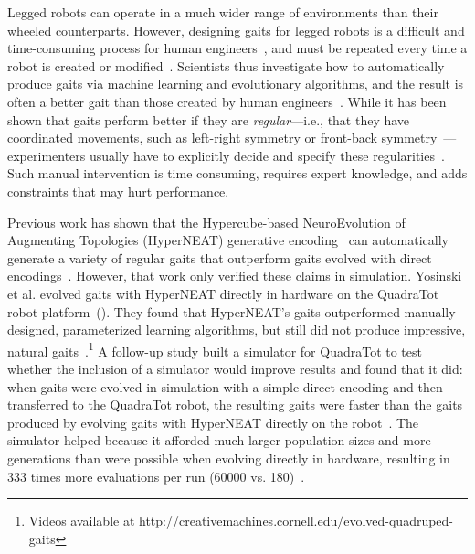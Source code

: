 
Legged robots can operate in a much wider range of environments than their wheeled counterparts. However, designing gaits for legged robots is a difficult and time-consuming process for human engineers~\cite{strom1999legged,wettergreen1992gait}, and must be repeated every time a robot is created or modified~\cite{hornby2005autonomous}. 
Scientists thus investigate how to automatically produce gaits via machine learning and evolutionary algorithms, and the result is often a better gait than those created by human engineers~\cite{valsalam:mii,kohl:stone,hornby2005autonomous,hornby2003generative,yos:clune}. While it has been shown that gaits perform better if they are \emph{regular}---i.e., that they have coordinated movements, such as left-right symmetry or front-back symmetry~\cite{valsalam:mii,clune2011performance,clune2009evolving,clune2009sensitivity}---experimenters usually have to explicitly decide and specify these regularities~\cite{valsalam:mii,tellez,beer,raibert}. 
Such manual intervention is time consuming, requires expert knowledge, and adds constraints that may hurt performance. 

Previous work has shown that the Hypercube-based NeuroEvolution of Augmenting Topologies (HyperNEAT) generative encoding~\cite{stanley2009hypercube} can automatically generate a variety of regular gaits that outperform gaits evolved with direct encodings~\cite{clune2009evolving,clune2011performance}.
However, that work only verified these claims in simulation. 
Yosinski et al. evolved gaits with HyperNEAT directly in hardware on the QuadraTot robot platform~(). They found that HyperNEAT's gaits outperformed manually designed, parameterized learning algorithms, but still did not produce impressive, natural gaits~\cite{yos:clune}.\footnote{Videos available at http://creativemachines.cornell.edu/evolved-quadruped-gaits}
A follow-up study built a simulator for QuadraTot to test whether the inclusion of a simulator would improve results and found that it did:  when gaits were evolved in simulation with a simple direct encoding and then transferred to the QuadraTot robot, the resulting gaits were faster than the gaits produced by evolving gaits with HyperNEAT directly on the robot~\cite{glette}. 
The simulator helped because it afforded much larger population sizes and more generations than were possible when evolving directly in hardware, resulting in 333 times more evaluations per run (60000 vs. 180)~\cite{yos:clune,glette}. 

